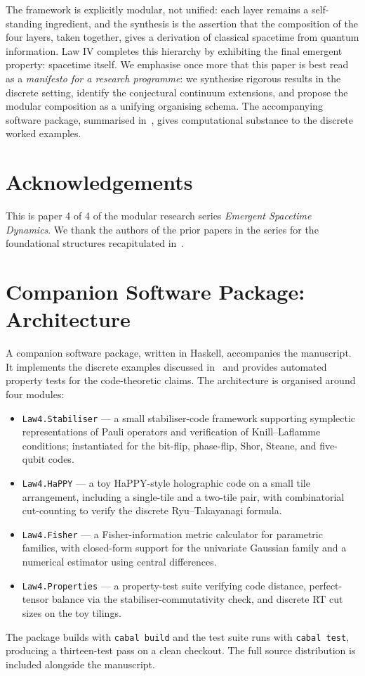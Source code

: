 \documentclass[12pt]{article}
\theoremstyle{definition}
\theoremstyle{remark}
\begin{document}
The framework is explicitly modular, not unified: each layer remains a self-standing ingredient, and the synthesis is the assertion that the composition of the four layers, taken together, gives a derivation of classical spacetime from quantum information. Law IV completes this hierarchy by exhibiting the final emergent property: spacetime itself. We emphasise once more that this paper is best read as a \emph{manifesto for a research programme}: we synthesise rigorous results in the discrete setting, identify the conjectural continuum extensions, and propose the modular composition as a unifying organising schema. The accompanying software package, summarised in~, gives computational substance to the discrete worked examples.

\section*{Acknowledgements}

This is paper 4 of 4 of the modular research series \emph{Emergent Spacetime Dynamics}. We thank the authors of the prior papers in the series for the foundational structures recapitulated in~.

\appendix

\section{Companion Software Package: Architecture}
\label{app:haskell}

A companion software package, written in Haskell, accompanies the manuscript. It implements the discrete examples discussed in~ and provides automated property tests for the code-theoretic claims. The architecture is organised around four modules:
\begin{itemize}
  \item \texttt{Law4.Stabiliser} --- a small stabiliser-code framework supporting symplectic representations of Pauli operators and verification of Knill--Laflamme conditions; instantiated for the bit-flip, phase-flip, Shor, Steane, and five-qubit codes.
  \item \texttt{Law4.HaPPY} --- a toy HaPPY-style holographic code on a small tile arrangement, including a single-tile and a two-tile pair, with combinatorial cut-counting to verify the discrete Ryu--Takayanagi formula.
  \item \texttt{Law4.Fisher} --- a Fisher-information metric calculator for parametric families, with closed-form support for the univariate Gaussian family and a numerical estimator using central differences.
  \item \texttt{Law4.Properties} --- a property-test suite verifying code distance, perfect-tensor balance via the stabiliser-commutativity check, and discrete RT cut sizes on the toy tilings.
\end{itemize}
The package builds with \texttt{cabal build} and the test suite runs with \texttt{cabal test}, producing a thirteen-test pass on a clean checkout. The full source distribution is included alongside the manuscript.
\end{document}
